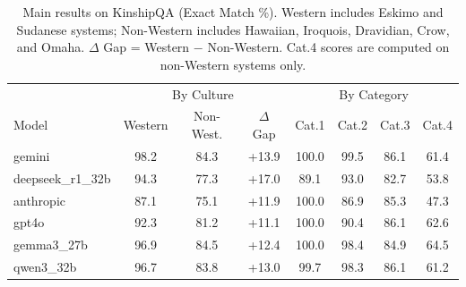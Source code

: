 \begin{table}[t]
\centering
\caption{Main results on KinshipQA (Exact Match \%). Western includes Eskimo and Sudanese systems; Non-Western includes Hawaiian, Iroquois, Dravidian, Crow, and Omaha. $\Delta$ Gap = Western $-$ Non-Western. Cat.4 scores are computed on non-Western systems only.}
\label{tab:main-results}
\begin{tabular}{l|ccc|cccc}
\toprule
 & \multicolumn{3}{c|}{By Culture} & \multicolumn{4}{c}{By Category} \\
Model & Western & Non-West. & $\Delta$ Gap & Cat.1 & Cat.2 & Cat.3 & Cat.4 \\
\midrule
gemini & 98.2 & 84.3 & +13.9 & 100.0 & 99.5 & 86.1 & 61.4 \\
deepseek_r1_32b & 94.3 & 77.3 & +17.0 & 89.1 & 93.0 & 82.7 & 53.8 \\
anthropic & 87.1 & 75.1 & +11.9 & 100.0 & 86.9 & 85.3 & 47.3 \\
gpt4o & 92.3 & 81.2 & +11.1 & 100.0 & 90.4 & 86.1 & 62.6 \\
gemma3_27b & 96.9 & 84.5 & +12.4 & 100.0 & 98.4 & 84.9 & 64.5 \\
qwen3_32b & 96.7 & 83.8 & +13.0 & 99.7 & 98.3 & 86.1 & 61.2 \\
\bottomrule
\end{tabular}
\end{table}
